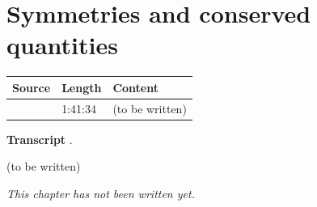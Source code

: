 \chapter{Symmetries and conserved quantities}\label{ch:c21}
\begin{paracol}{2}

\begin{sources}
\begin{tabularx}{\linewidth}{@{}l l L@{}}
\toprule
\textbf{Source} & \textbf{Length} & \textbf{Content}\\
\midrule
{} & 1:41:34 & (to be written)\\
\bottomrule
\end{tabularx}

\smallskip
\textbf{Transcript} .
\end{sources}

\begin{reading}
(to be written)
\end{reading}

\emph{This chapter has not been written yet.}

\flushside
\end{paracol}
